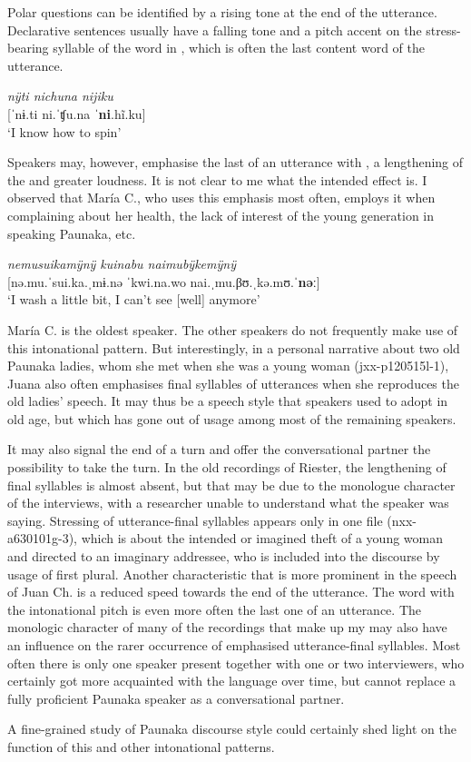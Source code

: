 Polar questions can be identified by a rising tone at the end of the utterance. 
Declarative sentences usually have a falling tone and a pitch accent on the stress-bearing syllable of the word in , which is often the last content word of the utterance.

 \ea\label{ex:intonation_simple}

        \textit{nÿti nichuna nijiku}  \\
        {[}ˈnɨ.ti ni.ˈʧu.na \textbf{ˈni}.hĩ.ku] \\
        ‘I know how to spin’ \trailingcitation{[jxx-p120515l-1.059]}
        \xe
        
Speakers may, however, emphasise the last  of an utterance with , a lengthening of the  and greater loudness. It is not clear to me what the intended effect is. I observed that María C., who uses this emphasis most often, employs it when complaining about her health, the lack of interest of the young generation in speaking Paunaka, etc. 

\ea\label{ex:intonation_long}

     \textit{nemusuikamÿnÿ kuinabu naimubÿkemÿnÿ}\\ %
    {[}nə.mu.ˈsui.ka.ˌmɨ.nə ˈkwi.na.wo nai.ˌmu.βʊ.ˌkə.mʊ.ˈ\textbf{nəː}] \\
    ‘I wash a little bit, I can't see [well] anymore’  \trailingcitation{[cux-c120410ls.107]}
    \xe

María C. is the oldest speaker. The other speakers do not frequently make use of this intonational pattern. But interestingly, in a personal narrative about two old Paunaka ladies, whom she met when she was a young woman (jxx-p120515l-1), Juana also often emphasises final syllables of utterances when she reproduces the old ladies’ speech. It may thus be a speech style that speakers used to adopt in old age, but which has gone out of usage among most of the remaining speakers.

It may also signal the end of a turn and offer the conversational partner the possibility to take the turn. In the old recordings of Riester, the lengthening of final syllables is almost absent, but that may be due to the monologue character of the interviews, with a researcher unable to understand what the speaker was saying. Stressing of utterance-final syllables appears only in one file (nxx-a630101g-3), which is about the intended or imagined theft of a young woman and directed to an imaginary addressee, who is included into the discourse by usage of first plural. Another characteristic that is more prominent in the speech of Juan Ch. is a reduced speed towards the end of the utterance. The word with the intonational pitch is even more often the last one of an utterance.
The monologic character of many of the recordings that make up my  may also have an influence on the rarer occurrence of emphasised utterance-final syllables. Most often there is only one speaker present together with one or two interviewers, who certainly got more acquainted with the language over time, but cannot replace a fully proficient Paunaka speaker as a conversational partner.

A fine-grained study of Paunaka discourse style could certainly shed light on the function of this and other intonational patterns.





